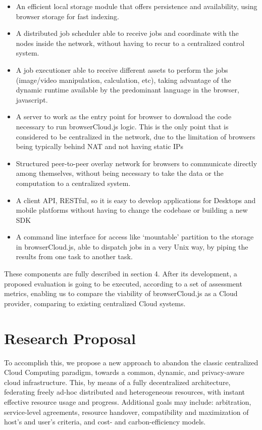 \begin{itemize}
    \item An efficient local storage module that offers persistence and availability, using browser storage for fast indexing.
    \item A distributed job scheduler able to receive jobs and coordinate with the nodes inside the network, without having to recur to a centralized control system.
    \item A job executioner able to receive different assets to perform the jobs (image/video manipulation, calculation, etc), taking advantage of the dynamic runtime available by the predominant language in the browser, javascript.
    \item A server to work as the entry point for browser to download the code necessary to run browserCloud.js logic. This is the only point that is considered to be centralized in the network, due to the limitation of browsers being typically behind NAT and not having static IPs
    \item Structured peer-to-peer overlay network for browsers to communicate directly among themselves, without being necessary to take the data or the computation to a centralized system.
    \item A client API, RESTful, so it is easy to develop applications for Desktops and mobile platforms without having to change the codebase or building a new SDK
    \item A command line interface for access like `mountable' partition to the storage in browserCloud.js, able to dispatch jobs in a very Unix way, by piping the results from one task to another task.
\end{itemize}

These components are fully described in section 4. After its development, a proposed evaluation is going to be executed, according to a set of assessment metrics, enabling us to compare the viability of browserCloud.js as a Cloud provider, comparing to existing centralized Cloud systems.

\section{Research Proposal}

To accomplish this, we propose a new approach to abandon the classic centralized Cloud Computing paradigm, towards a common, dynamic, and privacy-aware cloud infrastructure. This, by means of a fully decentralized architecture, federating freely ad-hoc distributed and heterogeneous resources, with instant effective resource usage and progress. Additional goals may include: arbitration, service-level agreements, resource handover, compatibility and maximization of host's and user's criteria, and cost- and carbon-efficiency models.

